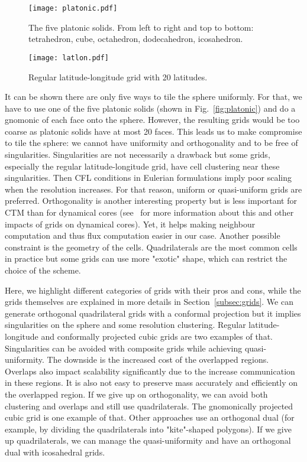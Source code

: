 \begin{figure}
  \begin{minipage}{0.48\linewidth}
    \centering
    \texttt{[image: platonic.pdf]}
    \caption{The five platonic solids. From left to right and top to bottom:
      tetrahedron, cube, octahedron, dodecahedron, icosahedron.}
    \label{fig:platonic}
  \end{minipage}
  \hfill
  \begin{minipage}{0.48\linewidth}
    \centering
    \texttt{[image: latlon.pdf]}
    \caption{Regular latitude-longitude grid with 20 latitudes.}
    \label{fig:latlon}
  \end{minipage}
\end{figure}
It can be shown there are only five ways to tile the sphere uniformly. For that,
we have to use one of the five platonic solids (shown in
Fig.~\ref{fig:platonic}) and do a \gls{gnomonic} of each face onto the sphere.
However, the resulting grids would be too coarse as platonic solids have at most
20 faces. This leads us to make compromise to tile the sphere: we cannot have
uniformity and orthogonality and to be free of singularities. Singularities are
not necessarily a drawback but some grids, especially the regular
latitude-longitude grid, have cell clustering near these singularities. Then
CFL conditions in Eulerian formulations imply poor scaling when the resolution
increases. For that reason, uniform or quasi-uniform grids are preferred.
Orthogonality is another interesting property but is less important for
\gls{CTM} than for dynamical cores (see~\cite{Staniforth2012} for more
information about this and other impacts of grids on dynamical cores). Yet, it
helps making neighbour computation and thus flux computation easier in our case.
Another possible constraint is the geometry of the cells. Quadrilaterals are the
most common cells in practice but some grids can use more "exotic" shape, which
can restrict the choice of the scheme.

Here, we highlight different categories of grids with their pros and cons, while
the grids themselves are explained in more details in Section~\ref{subsec:grids}.
We can generate orthogonal quadrilateral grids with a \gls{conformal} projection
but it implies singularities on the sphere and some resolution clustering.
Regular latitude-longitude and conformally projected cubic grids are two
examples of that. Singularities can be avoided with composite grids
while achieving quasi-uniformity. The downside is the increased cost of the
overlapped regions. Overlaps also impact scalability significantly due to the
increase communication in these regions. It is also not easy to preserve mass
accurately and efficiently on the overlapped region. If we give up on
orthogonality, we can avoid both clustering and overlaps and still use
quadrilaterals. The gnomonically projected cubic grid is one example of that.
Other approaches use an orthogonal dual (for example, by dividing the
quadrilaterals into "kite"-shaped polygons). If we give up quadrilaterals, we
can manage the quasi-uniformity and have an orthogonal dual with icosahedral
grids.

